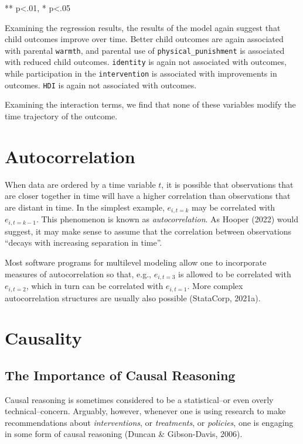 \documentclass[
  letterpaper,
  DIV=11,
  numbers=noendperiod]{scrreprt}
\begin{document}
** p\textless.01, * p\textless.05

Examining the regression results, the results of the model again suggest
that child outcomes improve over time. Better child outcomes are again
associated with parental \texttt{warmth}, and parental use of
\texttt{physical\_punishment} is associated with reduced child outcomes.
\texttt{identity} is again not associated with outcomes, while
participation in the \texttt{intervention} is associated with
improvements in outcomes. \texttt{HDI} is again not associated with
outcomes.

Examining the interaction terms, we find that none of these variables
modify the time trajectory of the outcome.

\section{Autocorrelation}\label{autocorrelation}

When data are ordered by a time variable \(t\), it is possible that
observations that are closer together in time will have a higher
correlation than observations that are distant in time. In the simplest
example, \(e_{i, t=k}\) may be correlated with \(e_{i, t=k-1}\). This
phenomenon is known as \emph{autocorrelation}. As Hooper (2022) would
suggest, it may make sense to assume that the correlation between
observations ``decays with increasing separation in time''.

Most software programs for multilevel modeling allow one to incorporate
measures of autocorrelation so that, e.g., \(e_{i,t=3}\) is allowed to
be correlated with \(e_{i,t=2}\), which in turn can be correlated with
\(e_{i,t=1}\). More complex autocorrelation structures are usually also
possible (StataCorp, 2021a).

\section{Causality}\label{sec-causality}

\subsection{The Importance of Causal
Reasoning}\label{the-importance-of-causal-reasoning}

Causal reasoning is sometimes considered to be a statistical--or even
overly technical--concern. Arguably, however, whenever one is using
research to make recommendations about \emph{interventions}, or
\emph{treatments}, or \emph{policies}, one is engaging in some form of
causal reasoning (Duncan \& Gibson-Davis, 2006). 
\end{document}
